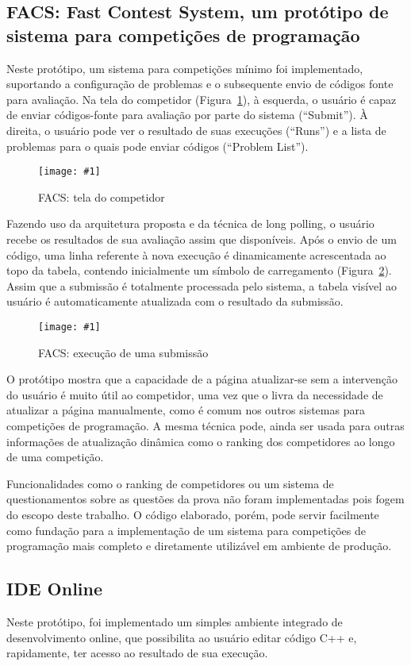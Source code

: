 \documentclass[ruledheader, 12pt]{abnt}
\newcommand{\figcustom}[4]{\par
	\begin{figure}[#3]
		\centering
		\texttt{[image: \#1]}
		\caption{\label{fig:#1}#2}
	\end{figure}
\par}
\newcommand{\fig}[2]{\figcustom{#1}{#2}{bp}{1}}
\newcommand{\figref}[1]{(Figura~\ref{fig:#1})}
\begin{document}
\subsection{FACS: Fast Contest System, um protótipo de sistema para competições de programação}

Neste protótipo, um sistema para competições mínimo foi implementado, suportando a configuração de problemas e o subsequente envio de códigos fonte para avaliação. Na tela do competidor \figref{facs}, à esquerda, o usuário é capaz de enviar códigos-fonte para avaliação por parte do sistema (``Submit''). À direita, o usuário pode ver o resultado de suas execuções (``Runs'') e a lista de problemas para o quais pode enviar códigos (``Problem List'').

\fig{facs}{FACS: tela do competidor}

Fazendo uso da arquitetura proposta e da técnica de long polling, o usuário recebe os resultados de sua avaliação assim que disponíveis. Após o envio de um código, uma linha referente à nova execução é dinamicamente acrescentada ao topo da tabela, contendo inicialmente um símbolo de carregamento \figref{facs-running}. Assim que a submissão é totalmente processada pelo sistema, a tabela visível ao usuário é automaticamente atualizada com o resultado da submissão.

\figcustom{facs-running}{FACS: execução de uma submissão}{tp}{1}

O protótipo mostra que a capacidade de a página atualizar-se sem a intervenção do usuário é muito útil ao competidor, uma vez que o livra da necessidade de atualizar a página manualmente, como é comum nos outros sistemas para competições de programação. A mesma técnica pode, ainda ser usada para outras informações de atualização dinâmica como o ranking dos competidores ao longo de uma competição.

Funcionalidades como o ranking de competidores ou um sistema de questionamentos sobre as questões da prova não foram implementadas pois fogem do escopo deste trabalho. O código elaborado, porém, pode servir facilmente como fundação para a implementação de um sistema para competições de programação mais completo e diretamente utilizável em ambiente de produção.

\subsection{IDE Online}

Neste protótipo, foi implementado um simples ambiente integrado de desenvolvimento online, que possibilita ao usuário editar código C++ e, rapidamente, ter acesso ao resultado de sua execução.
\end{document}
